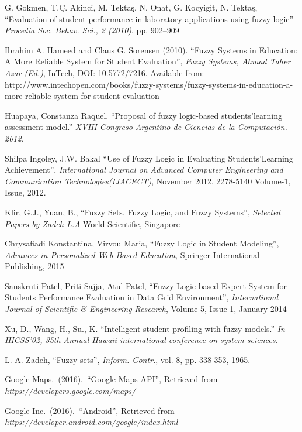 \documentclass[conference]{IEEEtran}
\newcommand{\quotes}[1]{``#1''}
\begin{document}
\begin{thebibliography}{11}

G. Gokmen, T.Ç. Akinci, M. Tektaş, N. Onat, G. Kocyigit, N. Tektaş, \quotes{Evaluation of student performance in laboratory applications using fuzzy logic} \emph{Procedia Soc. Behav. Sci., 2 (2010)}, pp. 902–909

Ibrahim A. Hameed and Claus G. Sorensen (2010). \quotes{Fuzzy Systems in Education: A More Reliable System for Student Evaluation}, \emph{Fuzzy Systems, Ahmad Taher Azar (Ed.)}, InTech, DOI: 10.5772/7216. Available from: http://www.intechopen.com/books/fuzzy-systems/fuzzy-systems-in-education-a-more-reliable-system-for-student-evaluation

Huapaya, Constanza Raquel. \quotes{Proposal of fuzzy logic-based students\rq learning assessment model.} \emph{XVIII Congreso Argentino de Ciencias de la Computación. 2012.}

Shilpa Ingoley, J.W. Bakal \quotes{Use of Fuzzy Logic in Evaluating Students\rq Learning Achievement}, \emph{International Journal on Advanced Computer Engineering and Communication Technologies(IJACECT)}, November 2012, 2278-5140 Volume-1, Issue, 2012.

Klir, G.J., Yuan, B., \quotes{Fuzzy Sets, Fuzzy Logic, and Fuzzy Systems}, \emph{Selected Papers by Zadeh L.A} World Scientific, Singapore 

Chrysafiadi Konstantina, Virvou Maria, \quotes{Fuzzy Logic in Student Modeling}, \emph{Advances in Personalized Web-Based Education}, Springer International Publishing, 2015

Sanskruti Patel, Priti Sajja, Atul Patel, \quotes{Fuzzy Logic based Expert System for Students Performance Evaluation in Data Grid Environment}, \emph{International Journal of Scientific \& Engineering Research}, Volume 5, Issue 1, January-2014

Xu, D., Wang, H., Su., K. \quotes{Intelligent student profiling with fuzzy models.} \emph{In HICSS’02, 35th Annual Hawaii international conference on system sciences.}

L. A. Zadeh, \quotes{Fuzzy sets}, \emph{Inform. Contr.}, vol. 8, pp. 338-353, 1965.

Google Maps.\ (2016).\ \quotes{Google Maps API},  Retrieved from \emph{https://developers.google.com/maps/}

Google Inc.\ (2016).\ \quotes{Android},  Retrieved from \emph{https://developer.android.com/google/index.html}

\end{thebibliography}
\end{document}
